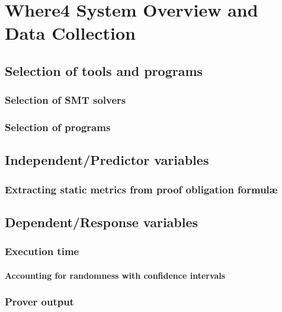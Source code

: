 \chapter{Where4 System Overview and Data Collection}%

\label{Experimental} %



\section{Selection of tools and programs}
\subsection{Selection of \textsc{SMT} solvers}
\subsection{Selection of \why programs}

\section{Independent/Predictor variables}
\subsection{Extracting static metrics from \why proof obligation formul\ae}
\label{sub:extracting}

\section{Dependent/Response variables}
\subsection{Execution time}
\subsubsection{Accounting for randomness with confidence intervals}
\subsection{Prover output}






